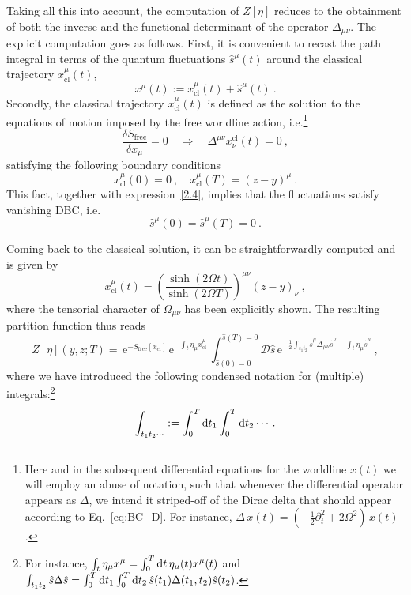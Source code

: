 \documentclass[12pt,a4paper]{article}
\numberwithin{equation}{section}
\numberwithin{equation}{section}
\begin{document}
Taking all this into account, the computation of $Z[\eta]$ reduces to the obtainment of both the inverse and the functional determinant of the operator $\Delta_{\mu\nu}$. The explicit computation goes as follows. First, it is convenient to recast the path integral in terms of the quantum fluctuations $\hat{s}^\mu(t)$ around the classical trajectory $x_{\mathrm{cl}}^\mu(t)$,
\begin{equation} \label{2.4}
x^\mu(t):=x_{\mathrm{cl}}^\mu(t)+\hat{s}^\mu(t)\ .
\end{equation}
Secondly, the classical trajectory $x_{\mathrm{cl}}^\mu(t)$ is defined as the solution to the equations of motion imposed by the free worldline action, i.e.\footnote{Here and in the subsequent differential equations for the worldline $x(t)$ we will employ an abuse of notation, such that whenever the differential operator appears as $\Delta$, we intend it striped-off of the Dirac delta that should appear according to Eq.~\eqref{eq:BC_D}. For instance, $\Delta \, x(t)=(-\tfrac12 \partial_t^2 +2\Omega^2) \, x(t)$.}
\begin{equation}\label{eq:BC_D}
\frac{\delta S_{\mathrm{free}}}{\delta x_\mu}=0 \quad \Longrightarrow \quad \Delta^{\mu\nu}x^{\mathrm{cl}}_\nu(t)=0\ ,
\end{equation}
satisfying the following boundary conditions 
\begin{equation} \label{bc}
x_{\mathrm{cl}}^\mu(0)=0\ , \quad x_{\mathrm{cl}}^\mu(T)=(z-y)^\mu\ .
\end{equation}
This fact, together with expression~\eqref{2.4}, implies that the fluctuations satisfy vanishing DBC, i.e.
\begin{equation} \label{DBC}
\hat{s}^\mu(0)=\hat{s}^\mu(T)=0\ .
\end{equation}

Coming back to the classical solution, it can be straightforwardly computed and is given by
\begin{equation} \label{hom}
x^\mu_{\mathrm{cl}}(t)=\left(\frac{\sinh{(2\Omega t)}}{\sinh{(2\Omega T)}}\right)^{\mu\nu}(z-y)_\nu\ ,
\end{equation}
where the tensorial character of $\Omega_{\mu\nu}$ has been explicitly shown. The resulting partition function thus reads 
\begin{equation} \label{2.9}
Z[\eta](y,z;T)= \, \mathrm{e}^{-S_{\mathrm{free}}[x_{\mathrm{cl}}]} \, \mathrm{e}^{-\int_{t} \eta_\mu x^\mu_{\mathrm{cl}}} \, \int_{\hat{s}(0)=0}^{\hat{s}(T)=0} \mathcal{D}\hat{s} \, \mathrm{e}^{-\frac12 \int_{t_1t_2} \hat{s}^\mu \Delta_{\mu\nu} \hat{s}^\nu-\int_t \eta_\mu \hat{s}^\mu}\ ,
\end{equation}
where we have introduced the following condensed notation for (multiple) integrals:\footnote{For instance, $\int_t \eta_\mu x^\mu=\int_0^T {\rm d}t \, \eta_\mu (t)x^\mu(t)$ and $\int_{t_1t_2} \hat{s} \Delta \hat{s}=\int_0^T {\rm d}t_1\int_0^T {\rm d}t_2 \, \hat{s}(t_1) \Delta(t_1,t_2) \hat{s}(t_2)$.} 
\begin{align}
 \int_{t_1t_2\cdots }:= \int_0^T {\rm d}t_1 \int_0^T {\rm d}t_2 \cdots. 
\end{align}
\end{document}
